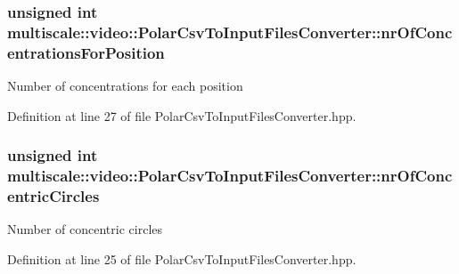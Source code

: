 \hypertarget{classmultiscale_1_1video_1_1PolarCsvToInputFilesConverter_a3a9301788514c50c295ca113a4114938}{
\subsubsection[{nr\-Of\-Concentrations\-For\-Position}]{\setlength{\rightskip}{0pt plus 5cm}unsigned int multiscale\-::video\-::\-Polar\-Csv\-To\-Input\-Files\-Converter\-::nr\-Of\-Concentrations\-For\-Position\hspace{0.3cm}{\ttfamily [private]}}}\label{classmultiscale_1_1video_1_1PolarCsvToInputFilesConverter_a3a9301788514c50c295ca113a4114938}
Number of concentrations for each position 

Definition at line 27 of file Polar\-Csv\-To\-Input\-Files\-Converter.\-hpp.

\hypertarget{classmultiscale_1_1video_1_1PolarCsvToInputFilesConverter_a7aa37d18880e822369cbe118a093e24f}{
\subsubsection[{nr\-Of\-Concentric\-Circles}]{\setlength{\rightskip}{0pt plus 5cm}unsigned int multiscale\-::video\-::\-Polar\-Csv\-To\-Input\-Files\-Converter\-::nr\-Of\-Concentric\-Circles\hspace{0.3cm}{\ttfamily [private]}}}\label{classmultiscale_1_1video_1_1PolarCsvToInputFilesConverter_a7aa37d18880e822369cbe118a093e24f}
Number of concentric circles 

Definition at line 25 of file Polar\-Csv\-To\-Input\-Files\-Converter.\-hpp.

